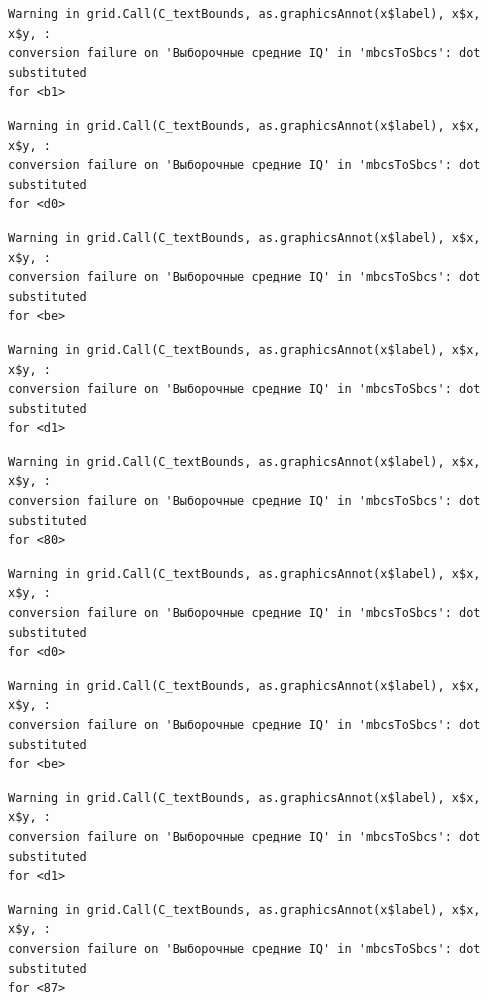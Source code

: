 \documentclass[
  letterpaper,
  DIV=11,
  numbers=noendperiod]{scrreprt}
\theoremstyle{definition}
\theoremstyle{remark}
\begin{document}
\begin{verbatim}
Warning in grid.Call(C_textBounds, as.graphicsAnnot(x$label), x$x, x$y, :
conversion failure on 'Выборочные средние IQ' in 'mbcsToSbcs': dot substituted
for <b1>
\end{verbatim}

\begin{verbatim}
Warning in grid.Call(C_textBounds, as.graphicsAnnot(x$label), x$x, x$y, :
conversion failure on 'Выборочные средние IQ' in 'mbcsToSbcs': dot substituted
for <d0>
\end{verbatim}

\begin{verbatim}
Warning in grid.Call(C_textBounds, as.graphicsAnnot(x$label), x$x, x$y, :
conversion failure on 'Выборочные средние IQ' in 'mbcsToSbcs': dot substituted
for <be>
\end{verbatim}

\begin{verbatim}
Warning in grid.Call(C_textBounds, as.graphicsAnnot(x$label), x$x, x$y, :
conversion failure on 'Выборочные средние IQ' in 'mbcsToSbcs': dot substituted
for <d1>
\end{verbatim}

\begin{verbatim}
Warning in grid.Call(C_textBounds, as.graphicsAnnot(x$label), x$x, x$y, :
conversion failure on 'Выборочные средние IQ' in 'mbcsToSbcs': dot substituted
for <80>
\end{verbatim}

\begin{verbatim}
Warning in grid.Call(C_textBounds, as.graphicsAnnot(x$label), x$x, x$y, :
conversion failure on 'Выборочные средние IQ' in 'mbcsToSbcs': dot substituted
for <d0>
\end{verbatim}

\begin{verbatim}
Warning in grid.Call(C_textBounds, as.graphicsAnnot(x$label), x$x, x$y, :
conversion failure on 'Выборочные средние IQ' in 'mbcsToSbcs': dot substituted
for <be>
\end{verbatim}

\begin{verbatim}
Warning in grid.Call(C_textBounds, as.graphicsAnnot(x$label), x$x, x$y, :
conversion failure on 'Выборочные средние IQ' in 'mbcsToSbcs': dot substituted
for <d1>
\end{verbatim}

\begin{verbatim}
Warning in grid.Call(C_textBounds, as.graphicsAnnot(x$label), x$x, x$y, :
conversion failure on 'Выборочные средние IQ' in 'mbcsToSbcs': dot substituted
for <87>
\end{verbatim}
\end{document}
